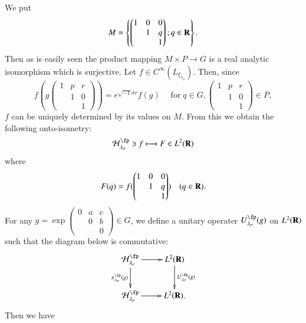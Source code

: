 We put
$$
M =\left\{\begin{pmatrix}
1 & 0 & 0 \\
  &  1 & q\\
  &    & 1
\end{pmatrix}
; q \in \mathbf{R} \right\}.
$$
Then as is easily seen the product mapping $M \times P \longrightarrow G$ is a real analytic isomorphism which is surjective. Let $f \in C^{\infty}(L_{\xi_{\lambda_{\sigma}}})$. Then, since
$$
f(g\begin{pmatrix}
1 & p & r \\
  &  1 & 0\\
  &    & 1
\end{pmatrix}
)= e^{\sqrt{-1}\sigma r} f(g) \quad\; \text{for}\; q \in G,  \begin{pmatrix}
1 & p & r \\
  &  1 & 0\\
  &    & 1
\end{pmatrix}
\in P,
$$
$f$ can be uniquely determined by its values on $M$. From this we obtain the following onto-isometry:
$$
\calH_{\lambda_{\sigma}}^{\fp}\ni f \longmapsto F \in L^{2}(\bR)
$$
where\pageoriginale
$$
F(q)=f(\begin{pmatrix}
1 & 0 & 0 \\
  &  1 & q\\
  &    & 1
\end{pmatrix}
) \quad (q \in \mathbf{R}).
$$
For any $g =\exp\begin{pmatrix}
0 & a & c\\
  & 0 & b\\
  &   & 0
\end{pmatrix}
\in G$, we define a unitary operater $U_{\lambda_{\sigma}}^{\fp}(g)$ on $L^{2}(\mathbf{R})$ such that the diagram below is commutative:
 $$
 \xymatrix{
\calH_{\lambda_{\sigma}}^{\fp}\ar[r]\ar [d]_-{\pi_{\lambda_{\sigma}}^{\fp}(g)} & L^{2}(\bR)\ar[d]^-{U_{\lambda_{\sigma}}^{\fp}(g)}\\
\calH_{\lambda_{\sigma}}^{\fp} \ar[r] & L^{2}(\bR).
} 
$$
Then we have
